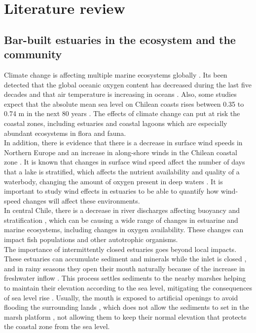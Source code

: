 \documentclass[tesis.tex]{subfiles}
\begin{document}
    
\section{Literature review}

\subsection{Bar-built estuaries in the ecosystem and the community}

Climate change is affecting multiple marine ecosystems globally \citep{hewitt2016multiple}. Its been detected that the global oceanic oxygen content has decreased during the last five decades \citep{schmidtko2017decline} and that air temperature is increasing in oceans \citep{omstedt2004baltic, jones1999surface}. Also, some studies expect that the absolute mean sea level on Chilean coasts rises between 0.35 to 0.74 m in the next 80 years \citep{winckler2020evidence}. The effects of climate change can put at risk the coastal zones, including estuaries and coastal lagoons which are especially abundant ecosystems in flora and fauna.\\

In addition, there is evidence that there is a decrease in surface wind speeds in Northern Europe \citep{woolway2017atmospheric} and an increase in along-shore winds in the Chilean coastal zone \citep{winckler2020evidence}. It is known that changes in surface wind speed affect the number of days that a lake is stratified, which affects the nutrient availability and quality of a waterbody, changing the amount of oxygen present in deep waters \citep{woolway2017atmospheric}. It is important to study wind effects in estuaries to be able to quantify how wind-speed changes will affect these environments.\\

In central Chile, there is a decrease in river discharges affecting buoyancy and stratification \citep{winckler2020evidence}, which can be causing a wide range of changes in estuarine and marine ecosystems, including changes in oxygen availability. These changes can impact fish populations and other autotrophic organisms.\\

The importance of intermittently closed estuaries goes beyond local impacts. These estuaries can accumulate sediment and minerals while the inlet is closed \citep{thorne2021wetlands}, and in rainy seasons they open their mouth naturally because of the increase in freshwater inflow \citep{hoeksema2018factors}. This process settles sediments to the nearby marshes helping to maintain their elevation according to the sea level, mitigating the consequences of sea level rise \citep{thorne2021wetlands}. Usually, the mouth is exposed to artificial openings to avoid flooding the surrounding lands \citep{Behrens2013}, which does not allow the sediments to set in the marsh platform \citep{thorne2021wetlands}, not allowing them to keep their normal elevation that protects the coastal zone from the sea level.\\
\end{document}
